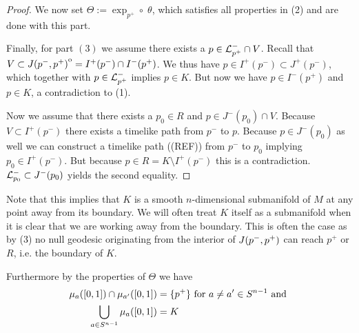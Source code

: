 \begin{proof}
We now set $\Theta:=\exp_{p^+}\circ \; \theta$, which satisfies all properties in (2) and are done with this part.

Finally, for part $(3)$ we assume there exists a $p\in \mathcal{L}^-_{p^+}\cap V$. Recall that $V\subset {\kern0ptJ(p^-,p^+)}^{\mathrm{o}}=I^+(p^-)\cap I^-(p^+)$. We thus have $p\in I^+(p^-)\subset J^+(p^-)$, which together with $p\in \mathcal{L}^-_{p^+}$ implies $p\in K$. But now we have $p\in I^-(p^+)$ and $p\in K$, a contradiction to (1).

Now we assume that there exists a $p_0\in R$ and $p\in J^-(p_0)\cap V$. Because $V\subset I^+(p^-)$ there exists a timelike path from $p^-$ to $p$. Because $p\in J^-(p_0)$ as well we can construct a timelike path ((REF)) from $p^-$ to $p_0$ implying $p_0\in I^+(p^-)$. But because $p\in R=K\setminus I^+(p^-)$ this is a contradiction. $\mathcal{L}^-_{p_0} \subset J^-(p_0)$ yields the second equality.

\end{proof}

Note that this implies that $K$ is a smooth $n$-dimensional submanifold of $M$ at any point away from its boundary. We will often treat $K$ itself as a submanifold when it is clear that we are working away from the boundary. This is often the case as by (3) no null geodesic originating from the interior of $J(p^-,p^+)$ can reach $p^+$ or $R$, i.e. the boundary of $K$.

Furthermore by the properties of $\Theta$ we have 
\begin{align}
    \mu_a([0,1])\cap \mu_{a'}([0,1]) &= \{p^+\} \text{ for } a\neq a'\in S^{n-1} \text{ and }\\
    \bigcup_{a\in S^{n-1}}\mu_a([0,1]) &= K
\end{align}

